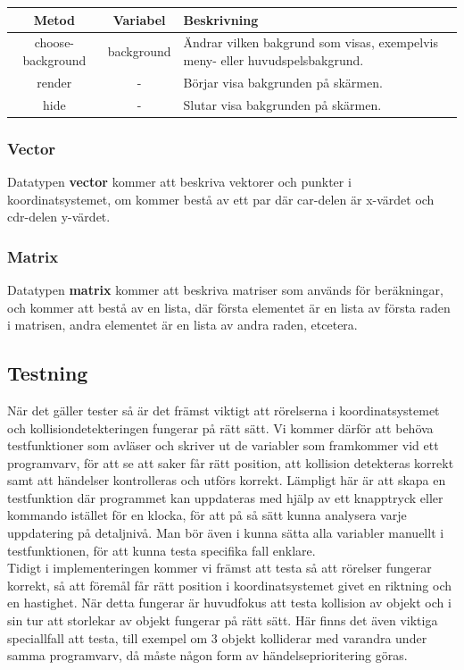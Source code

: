\documentclass[12pt,a4paper]{article}
\begin{document}
\vspace{0.2cm}

\begin{tabular}{| c | c | p{7cm} |}
	\hline
	\textbf{Metod} & \textbf{Variabel} & \textbf{Beskrivning} \\
	\hline
	
	choose-background & background & Ändrar vilken bakgrund som visas, exempelvis meny- eller huvudspelsbakgrund.\\
	\hline
	render & - & Börjar visa bakgrunden på skärmen. \\
	\hline
	hide & - & Slutar visa bakgrunden på skärmen. \\
	\hline
\end{tabular}

\subsubsection{Vector}
Datatypen \textbf{vector} kommer att beskriva vektorer och punkter i koordinatsystemet, om kommer bestå av ett par där car-delen är x-värdet och cdr-delen y-värdet.

\subsubsection{Matrix}
Datatypen \textbf{matrix} kommer att beskriva matriser som används för beräkningar, och kommer att bestå av en lista, där första elementet är en lista av första raden i matrisen, andra elementet är en lista av andra raden, etcetera.


\subsection{Testning}
När det gäller tester så är det främst viktigt att rörelserna i koordinatsystemet och kollisiondetekteringen fungerar på rätt sätt. Vi kommer därför att behöva testfunktioner som avläser och skriver ut de variabler som framkommer vid ett programvarv, för att se att saker får rätt position, att kollision detekteras korrekt samt att händelser kontrolleras och utförs korrekt. Lämpligt här är att skapa en testfunktion där programmet kan uppdateras med hjälp av ett knapptryck eller kommando istället för en klocka, för att på så sätt kunna analysera varje uppdatering på detaljnivå. Man bör även i kunna sätta alla variabler manuellt i testfunktionen, för att kunna testa specifika fall enklare. \\

Tidigt i implementeringen kommer vi främst att testa så att rörelser fungerar korrekt, så att föremål får rätt position i koordinatsystemet givet en riktning och en hastighet. När detta fungerar är huvudfokus att testa kollision av objekt och i sin tur att storlekar av objekt fungerar på rätt sätt. Här finns det även viktiga speciallfall att testa, till exempel om 3 objekt kolliderar med varandra under samma programvarv, då måste någon form av händelseprioritering göras. \\
\end{document}
